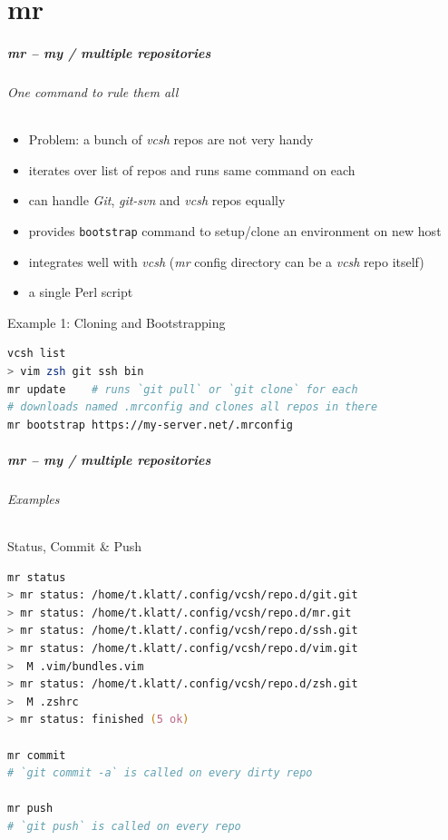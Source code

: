 \documentclass[english,hyperref={pdfpagelabels=false},aspectratio=169]{beamer}
\begin{document}
\part{mr}
\makepart

\begin{frame}[label=mr,fragile]
  \frametitle{mr -- my / multiple repositories}
  \framesubtitle{One command to rule them all}
  \begin{itemize}
    \item Problem: a bunch of \textit{vcsh} repos are not very handy
    \item iterates over list of repos and runs same command on each
    \item can handle \emph{Git}, \emph{git-svn} and \emph{vcsh} repos equally
    \item provides \texttt{bootstrap} command to setup/clone an environment on new host
    \item integrates well with \textit{vcsh} {\scriptsize\color{fzjgray50}(\textit{mr} config directory can be a \textit{vcsh} repo itself)}
    \item a single Perl script
  \end{itemize}
  \begin{block}{Example 1: Cloning and Bootstrapping}
    \vspace{-0.75em}
    \begin{lstlisting}[language=zsh]
vcsh list
> vim zsh git ssh bin
mr update    # runs `git pull` or `git clone` for each
# downloads named .mrconfig and clones all repos in there
mr bootstrap https://my-server.net/.mrconfig
    \end{lstlisting}
    \vspace{-0.75em}
  \end{block}
\end{frame}

\begin{frame}[fragile]
  \frametitle{mr -- my / multiple repositories}
  \framesubtitle{Examples}
  \begin{block}{Status, Commit \& Push}
    \vspace{-0.75em}
    \begin{lstlisting}[language=zsh]
mr status
> mr status: /home/t.klatt/.config/vcsh/repo.d/git.git
> mr status: /home/t.klatt/.config/vcsh/repo.d/mr.git
> mr status: /home/t.klatt/.config/vcsh/repo.d/ssh.git
> mr status: /home/t.klatt/.config/vcsh/repo.d/vim.git
>  M .vim/bundles.vim
> mr status: /home/t.klatt/.config/vcsh/repo.d/zsh.git
>  M .zshrc
> mr status: finished (5 ok)

mr commit
# `git commit -a` is called on every dirty repo

mr push
# `git push` is called on every repo
    \end{lstlisting}
    \vspace{-0.75em}
  \end{block}
\end{frame}
\end{document}

